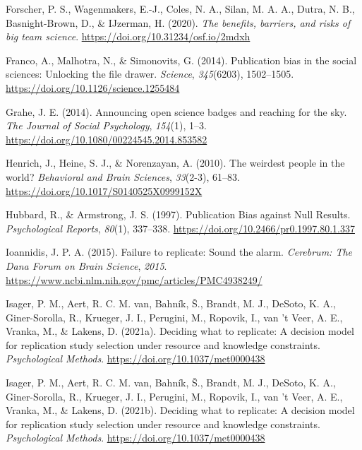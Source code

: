 \documentclass[
  man]{apa7}
\newlength{\cslhangindent}
\newlength{\cslentryspacingunit} %
\newenvironment{CSLReferences}[2] %
 {%
  \setlength{\parindent}{0pt}
  \ifodd #1
  \let\oldpar\par
  \def\par{\hangindent=\cslhangindent\oldpar}
  \fi
  \setlength{\parskip}{#2\cslentryspacingunit}
 }%
 {}
\begin{document}
\begin{CSLReferences}{1}{0}
\leavevmode{}%
Forscher, P. S., Wagenmakers, E.-J., Coles, N. A., Silan, M. A. A., Dutra, N. B., Basnight-Brown, D., \& IJzerman, H. (2020). \emph{The benefits, barriers, and risks of big team science}. \url{https://doi.org/10.31234/osf.io/2mdxh}

\leavevmode{}%
Franco, A., Malhotra, N., \& Simonovits, G. (2014). Publication bias in the social sciences: Unlocking the file drawer. \emph{Science}, \emph{345}(6203), 1502--1505. \url{https://doi.org/10.1126/science.1255484}

\leavevmode{}%
Grahe, J. E. (2014). Announcing open science badges and reaching for the sky. \emph{The Journal of Social Psychology}, \emph{154}(1), 1--3. \url{https://doi.org/10.1080/00224545.2014.853582}

\leavevmode{}%
Henrich, J., Heine, S. J., \& Norenzayan, A. (2010). The weirdest people in the world? \emph{Behavioral and Brain Sciences}, \emph{33}(2-3), 61--83. \url{https://doi.org/10.1017/S0140525X0999152X}

\leavevmode{}%
Hubbard, R., \& Armstrong, J. S. (1997). Publication Bias against Null Results. \emph{Psychological Reports}, \emph{80}(1), 337--338. \url{https://doi.org/10.2466/pr0.1997.80.1.337}

\leavevmode{}%
Ioannidis, J. P. A. (2015). Failure to replicate: Sound the alarm. \emph{Cerebrum: The Dana Forum on Brain Science}, \emph{2015}. \url{https://www.ncbi.nlm.nih.gov/pmc/articles/PMC4938249/}

\leavevmode{}%
Isager, P. M., Aert, R. C. M. van, Bahník, Š., Brandt, M. J., DeSoto, K. A., Giner-Sorolla, R., Krueger, J. I., Perugini, M., Ropovik, I., van 't Veer, A. E., Vranka, M., \& Lakens, D. (2021a). Deciding what to replicate: A decision model for replication study selection under resource and knowledge constraints. \emph{Psychological Methods}. \url{https://doi.org/10.1037/met0000438}

\leavevmode{}%
Isager, P. M., Aert, R. C. M. van, Bahník, Š., Brandt, M. J., DeSoto, K. A., Giner-Sorolla, R., Krueger, J. I., Perugini, M., Ropovik, I., van 't Veer, A. E., Vranka, M., \& Lakens, D. (2021b). Deciding what to replicate: A decision model for replication study selection under resource and knowledge constraints. \emph{Psychological Methods}. \url{https://doi.org/10.1037/met0000438}


\end{CSLReferences}
\end{document}
